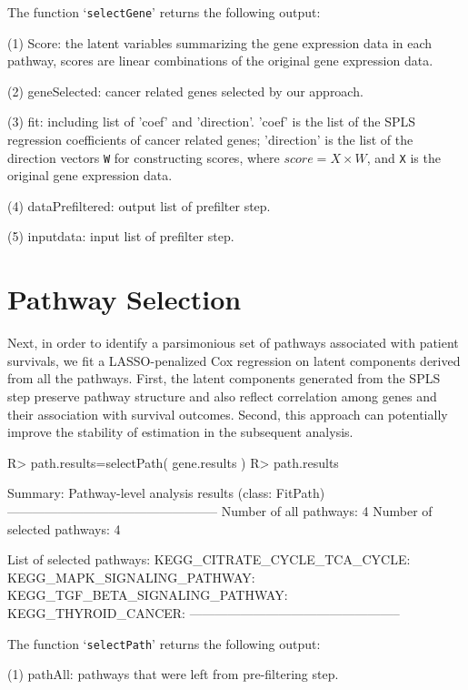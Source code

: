 \documentclass[11pt]{article}
\begin{document}
The function `\texttt{selectGene}' returns the following output:

(1) Score: the latent variables summarizing the gene expression data in each pathway, scores are linear combinations of the original gene expression data.

(2) geneSelected: cancer related genes selected by our approach.

(3) fit: including list of 'coef' and 'direction'. 'coef' is the list of the SPLS regression coefficients of cancer related genes; 'direction' is the list of the direction vectors \texttt{W} for constructing scores, where $score = X \times W$, and \texttt{X} is the original gene expression data.

(4) dataPrefiltered: output list of prefilter step.

(5) inputdata: input list of prefilter step.



\section{Pathway Selection}

Next, in order to identify a parsimonious set of pathways associated with patient survivals, we fit a LASSO-penalized\cite{LASSO} Cox regression on latent components derived from all the pathways.
First, the latent components generated from the SPLS step preserve pathway structure and also reflect correlation among genes and their association with survival outcomes. Second, this approach can potentially improve the stability of estimation in the subsequent analysis.
\begin{Schunk}
\begin{Sinput}
R> path.results=selectPath( gene.results )
R> path.results
\end{Sinput}
\begin{Soutput}
Summary: Pathway-level analysis results (class: FitPath)
--------------------------------------------------
Number of all pathways: 4
Number of selected pathways: 4

List of selected pathways:
	KEGG_CITRATE_CYCLE_TCA_CYCLE:
	KEGG_MAPK_SIGNALING_PATHWAY:
	KEGG_TGF_BETA_SIGNALING_PATHWAY:
	KEGG_THYROID_CANCER:
--------------------------------------------------
\end{Soutput}
\end{Schunk}
The function `\texttt{selectPath}' returns the following output:

(1) pathAll: pathways that were left from pre-filtering step.
\end{document}
